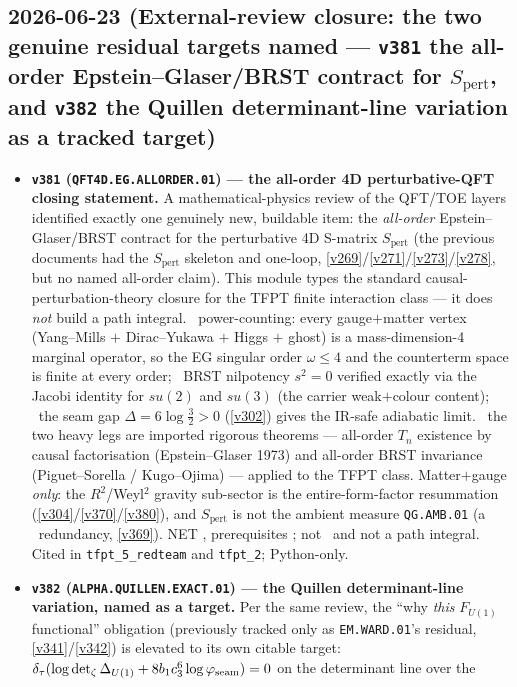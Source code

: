 \subsection*{2026-06-23 (External-review closure: the two genuine residual targets named --- \texttt{v381} the all-order Epstein--Glaser/BRST contract for $S_{\mathrm{pert}}$, and \texttt{v382} the Quillen determinant-line variation as a tracked target)}
\begin{itemize}
\item \textbf{\texttt{v381} (\texttt{QFT4D.EG.ALLORDER.01}) --- the all-order 4D perturbative-QFT closing statement.}
A mathematical-physics review of the QFT/TOE layers identified exactly one genuinely new, buildable item: the
\emph{all-order} Epstein--Glaser/BRST contract for the perturbative 4D S-matrix $S_{\mathrm{pert}}$ (the previous
documents had the $S_{\mathrm{pert}}$ skeleton and one-loop, \vref{v269}/\vref{v271}/\vref{v273}/\vref{v278}, but no
named all-order claim). This module types the standard causal-perturbation-theory closure for the TFPT finite
interaction class --- it does \emph{not} build a path integral. \mE\ power-counting: every gauge$+$matter vertex
(Yang--Mills $+$ Dirac--Yukawa $+$ Higgs $+$ ghost) is a mass-dimension-4 marginal operator, so the EG singular
order $\omega\le4$ and the counterterm space is finite at every order; \mE\ BRST nilpotency $s^2{=}0$ verified
exactly via the Jacobi identity for $su(2)$ and $su(3)$ (the carrier weak$+$colour content); \mE\ the seam gap
$\Delta=6\log\tfrac32>0$ (\vref{v302}) gives the IR-safe adiabatic limit. \mC\ the two heavy legs are imported
rigorous theorems --- all-order $T_n$ existence by causal factorisation (Epstein--Glaser 1973) and all-order BRST
invariance (Piguet--Sorella / Kugo--Ojima) --- applied to the TFPT class. Matter$+$gauge \emph{only}: the
$R^2$/Weyl$^2$ gravity sub-sector is the entire-form-factor resummation (\vref{v304}/\vref{v370}/\vref{v380}), and
$S_{\mathrm{pert}}$ is not the ambient measure \texttt{QG.AMB.01} (a \mC\ redundancy, \vref{v369}). NET \mC,
prerequisites \mE; not \mE\ and not a path integral. Cited in \texttt{tfpt\_5\_redteam} and \texttt{tfpt\_2}; Python-only.
\item \textbf{\texttt{v382} (\texttt{ALPHA.QUILLEN.EXACT.01}) --- the Quillen determinant-line variation, named as a target.}
Per the same review, the ``why \emph{this} $F_{U(1)}$ functional'' obligation (previously tracked only as
\texttt{EM.WARD.01}'s residual, \vref{v341}/\vref{v342}) is elevated to its own citable target:
$\delta_\tau(\log\det_\zeta\Delta_{U(1)}+8b_1c_3^6\log\varphi_{\mathrm{seam}})=0$ on the determinant line over the

\end{itemize}
